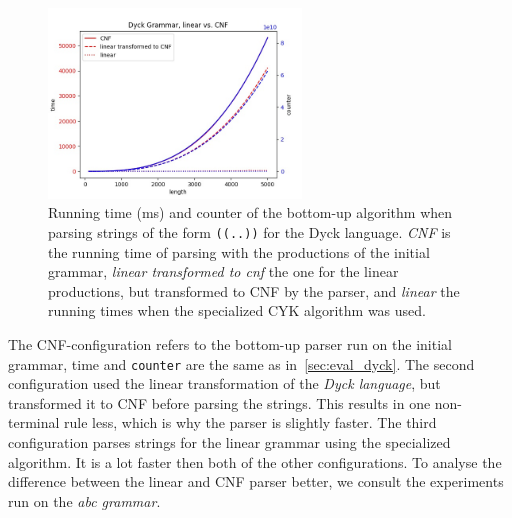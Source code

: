 \begin{figure}[!ht]
    \centering
    \includegraphics[width=0.6\textwidth]{Resources/t_c_dyck_lin_cnf.jpg}
    \caption{Running time (ms) and counter of the bottom-up algorithm when parsing strings of the form \texttt{((..))} for the Dyck language. \textit{CNF} is the running time of parsing with the productions of the initial grammar, \textit{linear transformed to cnf} the one for the linear productions, but transformed to CNF by the parser, and \textit{linear} the running times when the specialized CYK algorithm was used.}
    \label{fig:t_c_dyck_lin_cnf}
\end{figure}

The CNF-configuration refers to the bottom-up parser run on the initial grammar, time and \texttt{counter} are the same as in~\cref{sec:eval_dyck}.
The second configuration used the linear transformation of the \textit{Dyck language}, but transformed it to CNF before parsing the strings.
This results in one non-terminal rule less, which is why the parser is slightly faster.
The third configuration parses strings for the linear grammar using the specialized algorithm.
It is a lot faster then both of the other configurations.
To analyse the difference between the linear and CNF parser better, we consult the experiments run on the \textit{abc grammar}.


